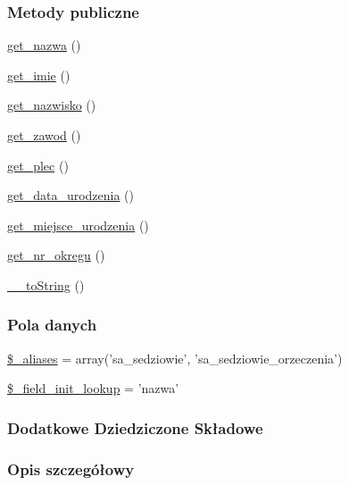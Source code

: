 \subsubsection*{Metody publiczne}
\begin{DoxyCompactItemize}
\item 
\hyperlink{classep___s_a___sedzia_ac0818f0049d7b84f08f77128f54cee36}{get\-\_\-nazwa} ()
\item 
\hyperlink{classep___s_a___sedzia_ac4b0c85dc2a130038f2d118dbd0c3d77}{get\-\_\-imie} ()
\item 
\hyperlink{classep___s_a___sedzia_abdd1d7ff92508da7f748ba1feec97af0}{get\-\_\-nazwisko} ()
\item 
\hyperlink{classep___s_a___sedzia_af80ca8310b60004454dd02a387deaa2c}{get\-\_\-zawod} ()
\item 
\hyperlink{classep___s_a___sedzia_ac7f9af5c3fa024e4c26a7b6bd4ce4bb4}{get\-\_\-plec} ()
\item 
\hyperlink{classep___s_a___sedzia_a880b240cd2d8c336fd1709bf0cb1ae2c}{get\-\_\-data\-\_\-urodzenia} ()
\item 
\hyperlink{classep___s_a___sedzia_ac57c08ec5e394a19c5bd9280c8376182}{get\-\_\-miejsce\-\_\-urodzenia} ()
\item 
\hyperlink{classep___s_a___sedzia_a2645a9f0aa5b0ccc482943348c033d0a}{get\-\_\-nr\-\_\-okregu} ()
\item 
\hyperlink{classep___s_a___sedzia_a7516ca30af0db3cdbf9a7739b48ce91d}{\-\_\-\-\_\-to\-String} ()
\end{DoxyCompactItemize}
\subsubsection*{Pola danych}
\begin{DoxyCompactItemize}
\item 
\hyperlink{classep___s_a___sedzia_ab4e31d75f0bc5d512456911e5d01366b}{\$\-\_\-aliases} = array('sa\-\_\-sedziowie', 'sa\-\_\-sedziowie\-\_\-orzeczenia')
\item 
\hyperlink{classep___s_a___sedzia_a4a4d54ae35428077a7c61ec8a5139af3}{\$\-\_\-field\-\_\-init\-\_\-lookup} = 'nazwa'
\end{DoxyCompactItemize}
\subsubsection*{Dodatkowe Dziedziczone Składowe}


\subsubsection{Opis szczegółowy}


